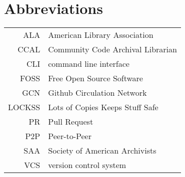 \chapter*{Abbreviations} 

\begin{longtable}{rl}
ALA & American Library Association \\
CCAL & Community Code Archival Librarian \\
CLI & command line interface\\
FOSS & Free Open Source Software \\
GCN & Github Circulation Network \\
LOCKSS & Lots of Copies Keeps Stuff Safe \\
PR & Pull Request \\
P2P & Peer-to-Peer \\
SAA & Society of American Archivists \\
VCS & version control system \\
\end{longtable}